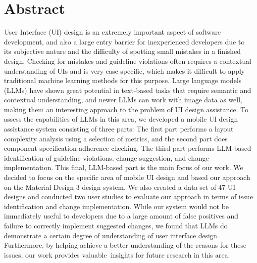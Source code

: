\documentclass[11pt,titlepage,oneside,openany]{book}
\begin{document}
\chapter{Abstract}
User Interface (UI) design is an extremely important aspect of software development, and also a large entry barrier for inexperienced developers due to its subjective nature and the difficulty of spotting small mistakes in a finished design. Checking for mistakes and guideline violations often requires a contextual understanding of UIs and is very case specific, which makes it difficult to apply traditional machine learning methods for this purpose. Large language models (LLMs) have shown great potential in text-based tasks that require semantic and contextual understanding, and newer LLMs can work with image data as well, making them an interesting approach to the problem of UI design assistance. To assess the capabilities of LLMs in this area, we developed a mobile UI design assistance system consisting of three parts: The first part performs a layout complexity analysis using a selection of metrics, and the second part does component specification adherence checking. The third part performs LLM-based identification of guideline violations, change suggestion, and change implementation. This final, LLM-based part is the main focus of our work. We decided to focus on the specific area of mobile UI design and based our approach on the Material Design 3 design system. We also created a data set of 47 UI designs and conducted two user studies to evaluate our approach in terms of issue identification and change implementation. While our system would not be immediately useful to developers due to a large amount of false positives and failure to correctly implement suggested changes, we found that LLMs do demonstrate a certain degree of understanding of user interface design. Furthermore, by helping achieve a better understanding of the reasons for these issues, our work provides valuable insights for future research in this area.

\tableofcontents
\newpage


\listoffigures



\newpage
\end{document}
